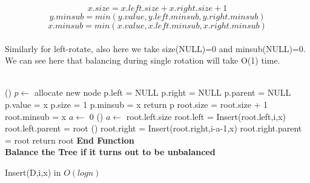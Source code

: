 \documentclass[a4 paper]{article}
\begin{document}
$$x.size = x.left.size + x.right.size + 1$$
$$y.minsub = min(y.value, y.left.minsub, y.right.minsub)$$
$$x.minsub = min(x.value, x.left.minsub, x.right.minsub)$$
\\Similarly for left-rotate, also here we take size(NULL)=0 and minsub(NULL)=0. We can see here that balancing during single rotation will take O(1) time. \\\\
\begin{algorithm}[H]
\SetAlgoLined
{}
%
\Fn(){\FRecurs}
{
    {   
        $p \leftarrow $ {allocate new node}\;
        p.left = NULL\;
        p.right = NULL\;
        p.parent = NULL\;
        p.value = x\;
        p.size = 1\;
        p.minsub = x\;
        return p\;
    }
    \Else
    {   
        root.size = root.size + 1\;
        {
            root.minsub = x\;
        }
        {
             $a \leftarrow $ 0\;
        }
        \Else(\tcc*[f]{})
        {
            $a \leftarrow $ root.left.size\;
        }
        {
             root.left = Insert(root.left,i,x)\;
             root.left.parent = root\;
        }
        \Else(\tcc*[f]{})
        {
            root.right = Insert(root.right,i-a-1,x)\;
            root.right.parent = root\;
        }
        return root\;
    }
}
\textbf{End Function}\\
\textbf{Balance the Tree if it turns out to be unbalanced}
\caption{Insert(D,i,x) in $O(logn)$}
\end{algorithm}
\vspace{4mm}
\newpage
{}
\end{document}
